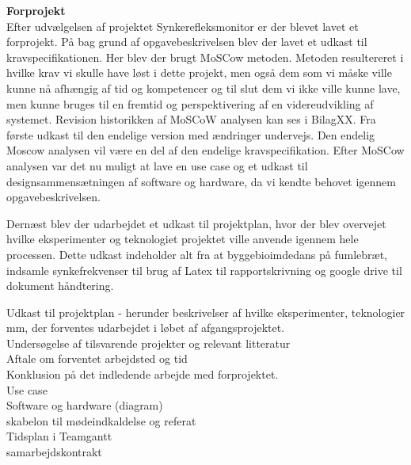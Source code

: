 \textbf{Forprojekt}\\
 
 Efter udvælgelsen af projektet Synkerefleksmonitor er der blevet lavet et forprojekt. På bag grund af opgavebeskrivelsen blev der lavet et udkast til kravspecifikationen. Her blev der brugt MoSCow metoden. Metoden resultereret i hvilke krav vi skulle have løst i dette projekt, men også dem som vi måske ville kunne nå afhængig af tid og kompetencer og til slut dem vi ikke ville kunne lave, men kunne bruges til en fremtid og perspektivering af en videreudvikling af systemet. Revision historikken af MoSCoW analysen kan ses i BilagXX. Fra første udkast til den endelige version med ændringer undervejs. Den endelig Moscow analysen vil være en del af den endelige kravspecifikation. Efter MoSCow analysen var det nu muligt at lave en use case og et udkast til designsammensætningen af software og hardware, da vi kendte behovet igennem opgavebeskrivelsen. 
 
Dernæst blev der udarbejdet et udkast til projektplan, hvor der blev overvejet hvilke eksperimenter og teknologiet projektet ville anvende igennem hele processen. Dette udkast indeholder alt fra at byggebioimdedans på fumlebræt, indsamle synkefrekvenser til brug af Latex til rapportskrivning og google drive til dokument håndtering. 
 
 
 
 
 Udkast til projektplan - herunder beskrivelser af hvilke eksperimenter, teknologier mm, der forventes udarbejdet i løbet af afgangsprojektet.\\
 
 Undersøgelse af tilsvarende projekter og relevant litteratur\\
 
 Aftale om forventet arbejdsted og tid\\
 
 Konklusion på det indledende arbejde med forprojektet.\\
 
 Use case\\
 
 Software og hardware (diagram)\\
 
 skabelon til mødeindkaldelse og referat\\
 
 Tidsplan i Teamgantt\\
 
 samarbejdskontrakt\\
 
